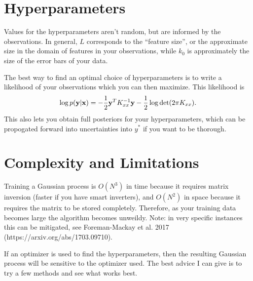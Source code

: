 \documentclass[11pt,twoside,a5paper]{article}
\newcommand{\bfx}{{\bf x}}
\newcommand{\bfy}{{\bf y}}
\begin{document}
\section{Hyperparameters}

Values for the hyperparameters aren't random, but are informed by the observations. In general, $L$ corresponds to the ``feature size'', or the approximate size in the domain of features in your observations, while $k_0$ is approximately the size of the error bars of your data.

The best way to find an optimal choice of hyperparameters is to write a likelihood of your observations which you can then maximize. This likelihood is
\begin{equation}
  \label{eq:likelihood}
  \log p(\bfy | \bfx) = -\frac{1}{2}\bfy^TK_{xx}^{-1}\bfy - \frac{1}{2}\log\det(2\pi K_{xx}).
\end{equation}
This also lets you obtain full posteriors for your hyperparameters, which can be propogated forward into uncertainties into $y^*$ if you want to be thorough.

\section{Complexity and Limitations}

Training a Gaussian process is $O(N^3)$ in time because it requires matrix inversion (faster if you have smart inverters), and $O(N^2)$ in space because it requires the matrix to be stored completely. Therefore, as your training data becomes large the algorithm becomes unweildy. Note: in very specific instances this can be mitigated, see Foreman-Mackay et al. 2017 (https://arxiv.org/abs/1703.09710).

If an optimizer is used to find the hyperparameters, then the resulting Gaussian process will be sensitive to the optimizer used. The best advice I can give is to try a few methods and see what works best.
\end{document}
